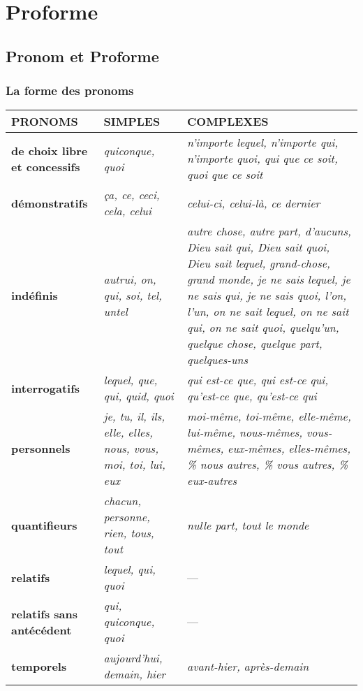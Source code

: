 \documentclass[UTF8]{report}
\begin{document}
\chapter{Proforme}
\section{Pronom et Proforme}
\subsection{La forme des pronoms}
\begin{longtable}{|>{\raggedright\arraybackslash}p{4cm}|>{\raggedright\arraybackslash}p{5cm}|>{\raggedright\arraybackslash}p{6cm}|}
\hline
\rowcolor{cyan!20}
\textbf{PRONOMS} & \textbf{SIMPLES} & \textbf{COMPLEXES} \\
\hline
\textbf{de choix libre et concessifs} & \textit{quiconque, quoi} & \textit{n’importe lequel, n’importe qui, n’importe quoi, qui que ce soit, quoi que ce soit} \\
\hline
\textbf{démonstratifs} & \textit{ça, ce, ceci, cela, celui} & \textit{celui-ci, celui-là, ce dernier} \\
\hline
\textbf{indéfinis} & \textit{autrui, on, qui, soi, tel, untel} & 
\textit{autre chose, autre part, d’aucuns, Dieu sait qui, Dieu sait quoi, Dieu sait lequel, grand-chose, grand monde, je ne sais lequel, je ne sais qui, je ne sais quoi, l’on, l’un, on ne sait lequel, on ne sait qui, on ne sait quoi, quelqu’un, quelque chose, quelque part, quelques-uns} \\
\hline
\textbf{interrogatifs} & \textit{lequel, que, qui, quid, quoi} & \textit{qui est-ce que, qui est-ce qui, qu’est-ce que, qu’est-ce qui} \\
\hline
\textbf{personnels} & \textit{je, tu, il, ils, elle, elles, nous, vous, moi, toi, lui, eux} & 
\textit{moi-même, toi-même, elle-même, lui-même, nous-mêmes, vous-mêmes, eux-mêmes, elles-mêmes, \% nous autres, \% vous autres, \% eux-autres} \\
\hline
\textbf{quantifieurs} & \textit{chacun, personne, rien, tous, tout} & \textit{nulle part, tout le monde} \\
\hline
\textbf{relatifs} & \textit{lequel, qui, quoi} & — \\
\hline
\textbf{relatifs sans antécédent} & \textit{qui, quiconque, quoi} & — \\
\hline
\textbf{temporels} & \textit{aujourd’hui, demain, hier} & \textit{avant-hier, après-demain} \\
\hline
\end{longtable}
\end{document}

